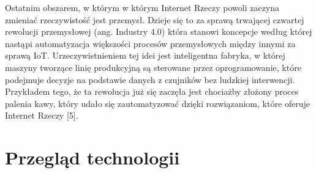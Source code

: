 \documentclass[12pt, twoside, openany]{mwrep}
\begin{document}
\par
Ostatnim obszarem, w którym w którym Internet Rzeczy powoli zaczyna zmieniać rzeczywistość jest przemysł. Dzieje się to za sprawą trwającej czwartej rewolucji przemysłowej (ang. Industry 4.0) która stanowi koncepcje według której nastąpi automatyzacja większości procesów przemysłowych między innymi za sprawą IoT. Urzeczywistnieniem tej idei jest inteligentna fabryka, w której maszyny tworzące linię produkcyjną są sterowane przez oprogramowanie, które podejmuje decyzje na podstawie danych z czujników bez ludzkiej interwencji. Przykładem tego, że ta rewolucja już się zaczęła jest chociażby złożony proces palenia kawy, który udało się zautomatyzować dzięki rozwiązaniom, które oferuje Internet Rzeczy [5].

\section{Przegląd technologii}
\end{document}
